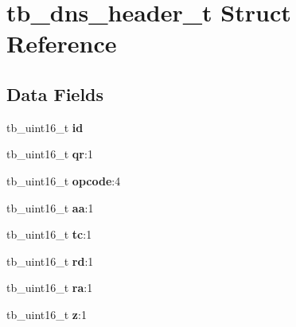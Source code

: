 \hypertarget{structtb__dns__header__t}{\section{tb\-\_\-dns\-\_\-header\-\_\-t Struct Reference}
\label{structtb__dns__header__t}
}
\subsection*{Data Fields}
\begin{DoxyCompactItemize}
\item 
\hypertarget{structtb__dns__header__t_a1359171aa95d07b3cfe1b63af5475d85}{tb\-\_\-uint16\-\_\-t {\bfseries id}}\label{structtb__dns__header__t_a1359171aa95d07b3cfe1b63af5475d85}

\item 
\hypertarget{structtb__dns__header__t_ae8c4cf6f91bcb0a1240687ab0e89d81a}{tb\-\_\-uint16\-\_\-t {\bfseries qr}\-:1}\label{structtb__dns__header__t_ae8c4cf6f91bcb0a1240687ab0e89d81a}

\item 
\hypertarget{structtb__dns__header__t_a7660fe5f54a26bce0597385adc2d5d40}{tb\-\_\-uint16\-\_\-t {\bfseries opcode}\-:4}\label{structtb__dns__header__t_a7660fe5f54a26bce0597385adc2d5d40}

\item 
\hypertarget{structtb__dns__header__t_a54bf855cac99373a96807aaee38dfc29}{tb\-\_\-uint16\-\_\-t {\bfseries aa}\-:1}\label{structtb__dns__header__t_a54bf855cac99373a96807aaee38dfc29}

\item 
\hypertarget{structtb__dns__header__t_aedcea4188378326f0871ed8440396e19}{tb\-\_\-uint16\-\_\-t {\bfseries tc}\-:1}\label{structtb__dns__header__t_aedcea4188378326f0871ed8440396e19}

\item 
\hypertarget{structtb__dns__header__t_ac962f3f3405a1020c88cc8f074350151}{tb\-\_\-uint16\-\_\-t {\bfseries rd}\-:1}\label{structtb__dns__header__t_ac962f3f3405a1020c88cc8f074350151}

\item 
\hypertarget{structtb__dns__header__t_a280c778cc55a1d495f27e5d832560c02}{tb\-\_\-uint16\-\_\-t {\bfseries ra}\-:1}\label{structtb__dns__header__t_a280c778cc55a1d495f27e5d832560c02}

\item 
\hypertarget{structtb__dns__header__t_a30456be0c7568a656370b43f82acdc05}{tb\-\_\-uint16\-\_\-t {\bfseries z}\-:1}\label{structtb__dns__header__t_a30456be0c7568a656370b43f82acdc05}


\end{DoxyCompactItemize}
